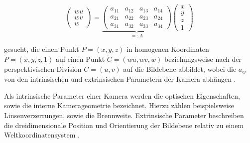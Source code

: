 \begin{equation}\label{eq:projectionMat}
	\begin{pmatrix}
	wu \\wv \\w
	\end{pmatrix} =
		\underbrace{\begin{pmatrix}
		a_{11} & a_{12} & a_{13} & a_{14} \\
		a_{21} & a_{22} & a_{23} & a_{24} \\
		a_{31} & a_{32} & a_{33} & a_{34}
		\end{pmatrix}}_{=:A}	\begin{pmatrix}
		x \\y \\z \\ 1
		\end{pmatrix}
\end{equation}


gesucht, die einen Punkt $P=(x,y,z)$ in homogenen Koordinaten $\tilde P = (x,y,z,1)$ auf einen Punkt $\tilde C = (wu,wv,w)$ beziehungsweise nach der perspektivischen Division $C = (u,v)$ auf die Bildebene abbildet, wobei die $a_{ij}$ von den intrinsischen und extrinsischen Parametern der Kamera abhängen \cite{Heikkila1997}.

Als intrinsische Parameter einer Kamera werden die optischen Eigenschaften, sowie die interne Kamerageometrie bezeichnet. Hierzu zählen beispielsweise Linsenverzerrungen, sowie die Brennweite.
Extrinsische Parameter beschreiben die dreidimensionale Position und Orientierung der Bildebene relativ zu einem Weltkoordinatensystem  \cite{Tsai1987}.

%

